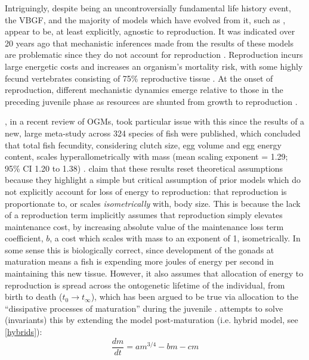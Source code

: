 \documentclass[a4paper]{article} %
\begin{document}
        Intriguingly, despite being an uncontroversially fundamental life history event, the VBGF, and the majority of models which have evolved from it, such as \cite{West2001}, appear to be, at least explicitly, agnostic to reproduction. It was indicated over 20 years ago that mechanistic inferences made from the results of these models are problematic since they do not account for reproduction \autocite{Day1997, Marshall2019b}. Reproduction incurs large energetic costs and increases an organism's mortality risk, with some highly fecund vertebrates consisting of 75\% reproductive tissue \autocite{Parker2018}. At the onset of reproduction, different mechanistic dynamics emerge relative to those in the preceding juvenile phase as resources are shunted from growth to reproduction \autocite{Day1997}. 
            
        \cite{Marshall2019b}, in a recent review of OGMs, took particular issue with this since the results of a new, large meta-study across 324 species of fish were published, which concluded that total fish fecundity, considering clutch size, egg volume and egg energy content, scales hyperallometrically with mass (mean scaling exponent = 1.29; 95\% CI 1.20 to 1.38) \autocite{Barneche2018d}. \cite{Marshall2019b} claim that these results reset theoretical assumptions because they highlight a simple but critical assumption of prior models which do not explicitly account for loss of energy to reproduction: that reproduction is proportionate to, or scales \textit{isometrically} with, body size. This is because the lack of a reproduction term implicitly assumes that reproduction simply elevates maintenance cost, by increasing absolute value of the maintenance loss term coefficient, $b$, a cost which scales with mass to an exponent of 1, isometrically. In some sense this is biologically correct, since development of the gonads at maturation means a fish is expending more joules of energy per second in maintaining this new tissue. However, it also assumes that allocation of energy to reproduction is spread across the ontogenetic lifetime of the individual, from birth to death ($t_0 \rightarrow t_{\infty}$), which has been argued to be true via allocation to the ``dissipative processes of maturation'' during the juvenile \autocite{Kearney2019}. \cite{Charnov2001} attempts to solve (invariants) this by extending the \cite{West2001} model post-maturation (i.e. hybrid model, see \ref{hybrids}):
        \begin{equation}
            \frac{dm}{dt} = am^{3/4} - bm - cm \label{charnov_ogm}
        \end{equation}
\end{document}

